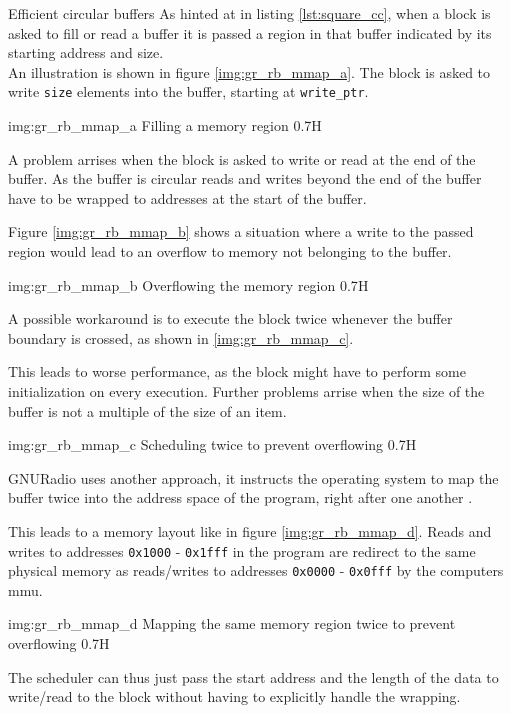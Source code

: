\begin{subchapter}{Efficient circular buffers}
  As hinted at in listing \ref{lst:square_cc}, when a block
  is asked to fill or read a buffer it is passed a region in
  that buffer indicated by its starting address and size. \\

  An illustration is shown in figure \ref{img:gr_rb_mmap_a}.
  The block is asked to write \texttt{size} elements into
  the buffer, starting at \texttt{write\_ptr}.

               {img:gr_rb_mmap_a}
               {Filling a memory region}
               {0.7}{H}

  A problem arrises when the block is asked to write or read
  at the end of the buffer.
  As the buffer is circular reads and writes beyond the
  end of the buffer have to be wrapped to addresses at the start of the
  buffer.

  Figure \ref{img:gr_rb_mmap_b} shows a situation where
  a write to the passed region would lead to an overflow
  to memory not belonging to the buffer.

               {img:gr_rb_mmap_b}
               {Overflowing the memory region}
               {0.7}{H}

  A possible workaround is to execute the block
  twice whenever the buffer boundary is crossed,
  as shown in \ref{img:gr_rb_mmap_c}.

  This leads to worse performance, as the block might have
  to perform some initialization on every execution.
  Further problems arrise when the size of the buffer is not
  a multiple of the size of an item.

               {img:gr_rb_mmap_c}
               {Scheduling twice to prevent overflowing}
               {0.7}{H}

  GNURadio uses another approach, it instructs the operating system
  to map the buffer twice into the address space of the program,
  right after one another \cite{grrdbufmmap}.

  This leads to a memory layout like in figure \ref{img:gr_rb_mmap_d}.
  Reads and writes to addresses \texttt{0x1000} - \texttt{0x1fff} in the program
  are redirect to the same physical memory as reads/writes to addresses
  \texttt{0x0000} - \texttt{0x0fff} by the computers \gls{mmu}.

               {img:gr_rb_mmap_d}
               {Mapping the same memory region twice to prevent overflowing}
               {0.7}{H}

  The scheduler can thus just pass the start address and the length of
  the data to write/read to the block without having to explicitly handle
  the wrapping.
\end{subchapter}
